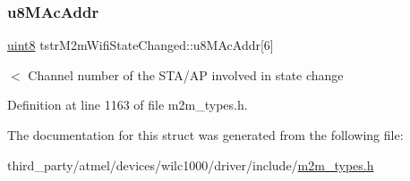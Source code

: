 \subsubsection{\texorpdfstring{u8\+M\+Ac\+Addr}{u8MAcAddr}}
{\footnotesize\ttfamily \hyperlink{group__DataT_ga4df709a77647e870bbf1d955b8edc9a6}{uint8} tstr\+M2m\+Wifi\+State\+Changed\+::u8\+M\+Ac\+Addr\mbox{[}6\mbox{]}}

$<$ Channel number of the S\+T\+A/\+AP involved in state change 

Definition at line 1163 of file m2m\+\_\+types.\+h.



The documentation for this struct was generated from the following file\+:\begin{DoxyCompactItemize}
\item 
third\+\_\+party/atmel/devices/wilc1000/driver/include/\hyperlink{m2m__types_8h}{m2m\+\_\+types.\+h}\end{DoxyCompactItemize}
